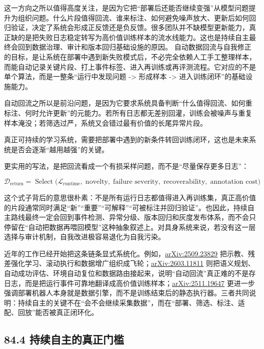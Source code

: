 这一方向之所以值得高度关注，是因为它把“部署后还能否继续变强”从模型问题提升为组织问题。什么片段值得回流、谁来标注、如何避免噪声放大、更新后如何回归验证，决定了系统会形成正反馈还是负反馈。很多团队并不缺模型更新能力，真正缺的是把失败日志稳定转写为高价值训练样本的流水线能力。这也是持续自主最终会回到数据治理、审计和版本回归基础设施的原因。 自动数据回流与自我修正的目标，是让系统在部署中遇到新失败模式后，不必完全依赖人工手工整理样本，而能自动记录关键片段、打上事件标签、进入再训练或再评测流程。它对应的不是单个算法，而是一整条“运行中发现问题 -> 形成样本 -> 进入训练闭环”的基础设施能力。

自动回流之所以是前沿问题，是因为它要求系统具备判断“什么值得回流、如何重标注、何时允许更新”的元能力。若所有日志都无差别回灌，训练会被噪声与重复样本淹没；若筛选过严，系统又会错过最有价值的长尾异常片段。

真正可持续的学习系统，需要把部署中遇到的新条件转回训练闭环，这也是未来系统是否会逐渐“越用越强”的关键。

更实用的写法，是把回流看成一个有损采样问题，而不是“尽量保存更多日志”：

\begingroup
\scriptsize
\begin{equation*}
\mathcal{D}_{\text{return}} =
\operatorname{Select}\!\bigl(\mathcal{L}_{\text{runtime}},\;
\text{novelty},\;
\text{failure severity},\;
\text{recoverability},\;
\text{annotation cost}\bigr)
\end{equation*}
\endgroup

这个式子背后的意思很朴素：不是所有运行日志都值得进入再训练集，真正高价值的片段通常同时满足“新”“重要”“可解释”“可被标注并回归验证”。也因此，持续自主路线最终一定会回到事件检测、异常分级、版本回归和灰度发布体系，而不会只停留在“自动把数据再喂回模型”这种抽象叙述上。对具身系统来说，若没有这一层选择与审计机制，自我改进极容易退化为自我污染。

近年的工作已经开始把这条链条显式系统化。例如，\href{https://arxiv.org/abs/2509.23829}{arXiv:2509.23829} 把示教、残差强化学习、滚动执行和数据增广组织成飞轮；\href{https://arxiv.org/abs/2603.11811}{arXiv:2603.11811} 则把语义规划、自动成功评估、环境自动复位和数据路由接起来，说明“自动回流”真正难的不是存日志，而是把运行事件可靠地翻译成高价值训练样本；\href{https://arxiv.org/abs/2511.19647}{arXiv:2511.19647} 更进一步强调部署机器人本身就是数据引擎，而不是训练结束后的静态执行器。三者共同说明：持续自主的关键不在“会不会继续采集数据”，而在“部署、筛选、标注、适配、回放”能否被真正闭环化。

\subsection*{84.4 持续自主的真正门槛}


